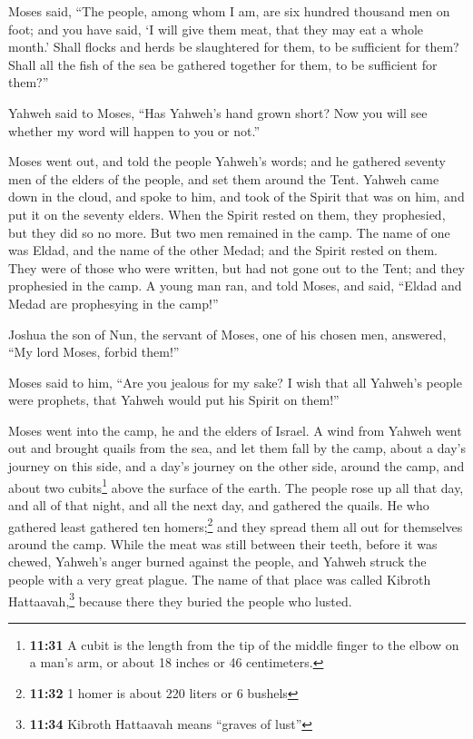  Moses said, ``The people, among whom I am, are six
hundred thousand men on foot; and you have said, `I will give them meat,
that they may eat a whole month.'  Shall flocks and herds
be slaughtered for them, to be sufficient for them? Shall all the fish
of the sea be gathered together for them, to be sufficient for them?''

 Yahweh said to Moses, ``Has Yahweh's hand grown short?
Now you will see whether my word will happen to you or not.''

 Moses went out, and told the people Yahweh's words; and
he gathered seventy men of the elders of the people, and set them around
the Tent.  Yahweh came down in the cloud, and spoke to
him, and took of the Spirit that was on him, and put it on the seventy
elders. When the Spirit rested on them, they prophesied, but they did so
no more.  But two men remained in the camp. The name of
one was Eldad, and the name of the other Medad; and the Spirit rested on
them. They were of those who were written, but had not gone out to the
Tent; and they prophesied in the camp.  A young man ran,
and told Moses, and said, ``Eldad and Medad are prophesying in the
camp!''

 Joshua the son of Nun, the servant of Moses, one of his
chosen men, answered, ``My lord Moses, forbid them!''

 Moses said to him, ``Are you jealous for my sake? I wish
that all Yahweh's people were prophets, that Yahweh would put his Spirit
on them!''

 Moses went into the camp, he and the elders of Israel.
 A wind from Yahweh went out and brought quails from the
sea, and let them fall by the camp, about a day's journey on this side,
and a day's journey on the other side, around the camp, and about two
cubits\footnote{\textbf{11:31} A cubit is the length from the tip of the
  middle finger to the elbow on a man's arm, or about 18 inches or 46
  centimeters.} above the surface of the earth.  The
people rose up all that day, and all of that night, and all the next
day, and gathered the quails. He who gathered least gathered ten
homers;\footnote{\textbf{11:32} 1 homer is about 220 liters or 6 bushels}
and they spread them all out for themselves around the camp.
 While the meat was still between their teeth, before it
was chewed, Yahweh's anger burned against the people, and Yahweh struck
the people with a very great plague.  The name of that
place was called Kibroth Hattaavah,\footnote{\textbf{11:34} Kibroth
  Hattaavah means ``graves of lust''} because there they buried the
people who lusted.

